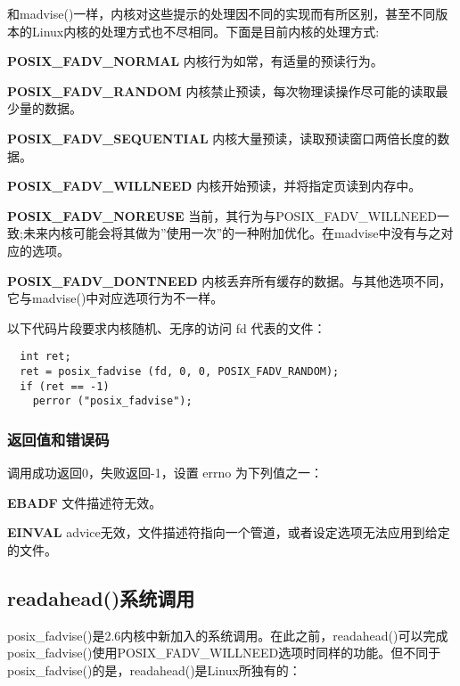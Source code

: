 和madvise()一样，内核对这些提示的处理因不同的实现而有所区别，甚至不同版本的Linux内核的处理方式也不尽相同。下面是目前内核的处理方式:

\begin{eqlist*}
\item[\textbf{POSIX\_FADV\_NORMAL}] 内核行为如常，有适量的预读行为。
\item[\textbf{POSIX\_FADV\_RANDOM}] 内核禁止预读，每次物理读操作尽可能的读取最少量的数据。
\item[\textbf{POSIX\_FADV\_SEQUENTIAL}] 内核大量预读，读取预读窗口两倍长度的数据。
\item[\textbf{POSIX\_FADV\_WILLNEED}] 内核开始预读，并将指定页读到内存中。
\item[\textbf{POSIX\_FADV\_NOREUSE}] 当前，其行为与POSIX\_FADV\_WILLNEED一致;未来内核可能会将其做为''使用一次''的一种附加优化。在madvise中没有与之对应的选项。
\item[\textbf{POSIX\_FADV\_DONTNEED}] 内核丢弃所有缓存的数据。与其他选项不同，它与madvise()中对应选项行为不一样。
\end{eqlist*}

以下代码片段要求内核随机、无序的访问 fd 代表的文件：

\begin{lstlisting}
  int ret;
  ret = posix_fadvise (fd, 0, 0, POSIX_FADV_RANDOM);
  if (ret == -1)
    perror ("posix_fadvise");
\end{lstlisting}

\subsubsection{返回值和错误码}

调用成功返回0，失败返回-1，设置 errno 为下列值之一：

\begin{eqlist*}
\item[\textbf{EBADF}] 文件描述符无效。
\item [\textbf{EINVAL}] advice无效，文件描述符指向一个管道，或者设定选项无法应用到给定的文件。
\end{eqlist*}

\subsection{readahead()系统调用}

posix\_fadvise()是2.6内核中新加入的系统调用。在此之前，readahead()可以完成posix\_fadvise()使用POSIX\_FADV\_WILLNEED选项时同样的功能。但不同于posix\_fadvise()的是，readahead()是Linux所独有的：

